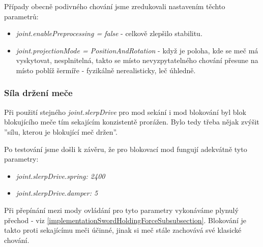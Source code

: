 Případy obecně podivného chování jsme zredukovali nastavením těchto parametrů:
\begin{itemize}
  \item \textit{joint.enablePreprocessing = false} - celkově zlepšilo stabilitu.
  \item \textit{joint.projectionMode = PositionAndRotation} - když je poloha, kde se meč má vyskytovat, nesplnitelná, takto se místo nevyzpytatelného chování přesune na místo poblíž šermíře - fyzikálně nerealisticky, leč úhledně.
\end{itemize}


\subsubsection*{Síla držení meče}

Při použití stejného \textit{joint.slerpDrive} pro mod sekání i mod blokování byl blok blokujícího meče tím sekajícím konzistentě prorážen. Bylo tedy třeba nějak zvýšit ''sílu, kterou je blokující meč držen''. 

Po testování jsme došli k závěru, že pro blokovací mod fungují adekvátně tyto parametry:
\begin{itemize}
  \item \textit{joint.slerpDrive.spring: 2400}
  \item \textit{joint.slerpDrive.damper: 5}
\end{itemize}

Při přepínání mezi mody ovládání pro tyto parametry vykonáváme plynulý přechod - viz \ref{implementationSwordHoldingForceSubsubsection}. Blokování je takto proti sekajícímu meči účinné, jinak si meč stále zachovává své klasické chování.


\pagebreak


